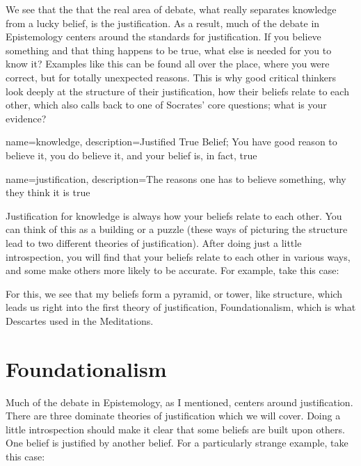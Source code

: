 We see that the that the real area of debate, what really separates knowledge from a lucky belief, is the justification. As a result, much of the debate in Epistemology centers around the standards for justification. If you believe something and that thing happens to be true, what else is needed for you to know it? Examples like this can be found all over the place, where you were correct, but for totally unexpected reasons. This is why good critical thinkers look deeply at the structure of their justification, how their beliefs relate to each other, which also calls back to one of Socrates' core questions; what is your evidence?



{
name=knowledge,
description={Justified True Belief; You have good reason to believe it, you do believe it, and your belief is, in fact, true}
}


{
name=justification,
description={The reasons one has to believe something, why they think it is true}
}

Justification for knowledge is always how your beliefs relate to each other. You can think of this as a building or a puzzle (these ways of picturing the structure lead to two different theories of justification). After doing just a little introspection, you will find that your beliefs relate to each other in various ways, and some make others more likely to be accurate. For example, take this case:


For this, we see that my beliefs form a pyramid, or tower, like structure, which leads us right into the first theory of justification, Foundationalism, which is what Descartes used in the Meditations.

\section{Foundationalism}
Much of the debate in Epistemology, as I mentioned, centers around justification. There are three dominate theories of justification which we will cover. Doing a little introspection should make it clear that some beliefs are built upon others. One belief is justified by another belief. For a particularly strange example, take this case: 

